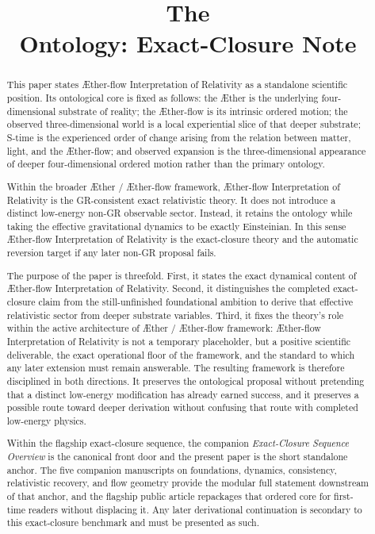 \documentclass[11pt]{article}
\title{The \TheoryName{}\\[0.4em]
Ontology: Exact-Closure Note}
\author{}
\date{}
\newcommand{\Aether}{\AE{}ther}
\newcommand{\Aflow}{\AE{}ther-flow}
\newcommand{\TheoryName}{\Aflow{} Interpretation of Relativity}
\newcommand{\TheoryProgram}{\Aether{} / \Aflow{} framework}
\begin{document}
\AetherFlowAPATitlePage

\begin{abstract}
This paper states \TheoryName{} as a standalone scientific position. Its ontological core is fixed as follows: the \Aether{} is the underlying four-dimensional substrate of reality; the \Aflow{} is its intrinsic ordered motion; the observed three-dimensional world is a local experiential slice of that deeper substrate; S-time is the experienced order of change arising from the relation between matter, light, and the \Aflow{}; and observed expansion is the three-dimensional appearance of deeper four-dimensional ordered motion rather than the primary ontology.

Within the broader \TheoryProgram{}, \TheoryName{} is the GR-consistent exact relativistic theory. It does not introduce a distinct low-energy non-GR observable sector. Instead, it retains the ontology while taking the effective gravitational dynamics to be exactly Einsteinian. In this sense \TheoryName{} is the exact-closure theory and the automatic reversion target if any later non-GR proposal fails.

The purpose of the paper is threefold. First, it states the exact dynamical content of \TheoryName{}. Second, it distinguishes the completed exact-closure claim from the still-unfinished foundational ambition to derive that effective relativistic sector from deeper substrate variables. Third, it fixes the theory's role within the active architecture of \TheoryProgram{}: \TheoryName{} is not a temporary placeholder, but a positive scientific deliverable, the exact operational floor of the framework, and the standard to which any later extension must remain answerable. The resulting framework is therefore disciplined in both directions. It preserves the ontological proposal without pretending that a distinct low-energy modification has already earned success, and it preserves a possible route toward deeper derivation without confusing that route with completed low-energy physics.

Within the flagship exact-closure sequence, the companion \emph{Exact-Closure Sequence Overview} is the canonical front door and the present paper is the short standalone anchor. The five companion manuscripts on foundations, dynamics, consistency, relativistic recovery, and flow geometry provide the modular full statement downstream of that anchor, and the flagship public article repackages that ordered core for first-time readers without displacing it. Any later derivational continuation is secondary to this exact-closure benchmark and must be presented as such.
\end{abstract}
\end{document}
